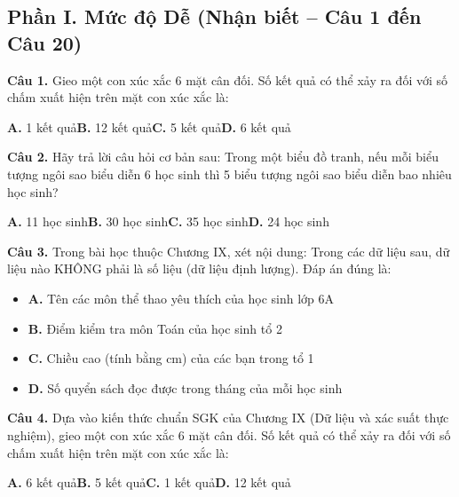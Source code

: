 \documentclass[11pt,a4paper]{article}
\begin{document}
\subsection*{\color{accent} Phần I. Mức độ Dễ (Nhận biết -- Câu 1 đến Câu 20)}
\textbf{\color{primary} Câu 1.} Gieo một con xúc xắc 6 mặt cân đối. Số kết quả có thể xảy ra đối với số chấm xuất hiện trên mặt con xúc xắc là:\par
\hspace*{1.5em}\textbf{A.} 1 kết quả\quad\quad \textbf{B.} 12 kết quả\quad\quad \textbf{C.} 5 kết quả\quad\quad \textbf{D.} 6 kết quả\par\vspace{2pt}
\textbf{\color{primary} Câu 2.} Hãy trả lời câu hỏi cơ bản sau: Trong một biểu đồ tranh, nếu mỗi biểu tượng ngôi sao biểu diễn 6 học sinh thì 5 biểu tượng ngôi sao biểu diễn bao nhiêu học sinh?\par
\hspace*{1.5em}\textbf{A.} 11 học sinh\quad\quad \textbf{B.} 30 học sinh\quad\quad \textbf{C.} 35 học sinh\quad\quad \textbf{D.} 24 học sinh\par\vspace{2pt}
\textbf{\color{primary} Câu 3.} Trong bài học thuộc Chương IX, xét nội dung: Trong các dữ liệu sau, dữ liệu nào KHÔNG phải là số liệu (dữ liệu định lượng). Đáp án đúng là:\par
\begin{itemize}\setlength{\itemsep}{1pt}\setlength{\parskip}{0pt}
  \item[] \textbf{A.} Tên các môn thể thao yêu thích của học sinh lớp 6A
  \item[] \textbf{B.} Điểm kiểm tra môn Toán của học sinh tổ 2
  \item[] \textbf{C.} Chiều cao (tính bằng cm) của các bạn trong tổ 1
  \item[] \textbf{D.} Số quyển sách đọc được trong tháng của mỗi học sinh
\end{itemize}\vspace{2pt}
\textbf{\color{primary} Câu 4.} Dựa vào kiến thức chuẩn SGK của Chương IX (Dữ liệu và xác suất thực nghiệm), gieo một con xúc xắc 6 mặt cân đối. Số kết quả có thể xảy ra đối với số chấm xuất hiện trên mặt con xúc xắc là:\par
\hspace*{1.5em}\textbf{A.} 6 kết quả\quad\quad \textbf{B.} 5 kết quả\quad\quad \textbf{C.} 1 kết quả\quad\quad \textbf{D.} 12 kết quả\par\vspace{2pt}
\end{document}
